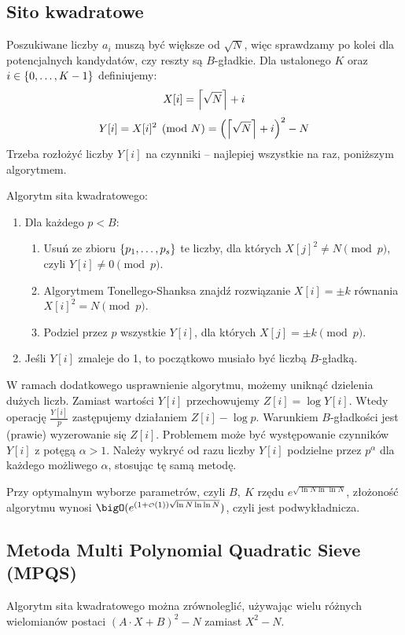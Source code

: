 \subsection{Sito kwadratowe}
Poszukiwane liczby \( a_i \) muszą być większe od \( \sqrt{N} \), więc sprawdzamy po kolei dla potencjalnych kandydatów, czy reszty są \( B \)-gładkie.
Dla ustalonego \( K \) oraz \( i \in \set{0, \dots, K-1} \) definiujemy:
\[ X[i] = \left\lceil\sqrt{N}\right\rceil + i \]
\[ Y[i] = X[i]^2 \pmod{N} = \left(\left\lceil\sqrt{N}\right\rceil + i\right)^2 - N \]
Trzeba rozłożyć liczby \( Y[i] \) na czynniki -- najlepiej wszystkie na raz, poniższym algorytmem.
\begin{greyframe}
    Algorytm sita kwadratowego:
    \begin{enumerate}
        \item Dla każdego \( p < B \):
        \begin{enumerate}
            \item Usuń ze zbioru \( \set{p_1, \dots, p_s} \) te liczby, dla których \( X[j]^2 \neq N \pmod{p} \), \\ czyli \( Y[i] \neq 0 \pmod{p} \).
            \item Algorytmem Tonellego-Shanksa znajdź rozwiązanie \( X[i] = \pm k \) równania \\ \( X[i]^2 = N \pmod{p} \).
            \item Podziel przez \( p \) wszystkie \( Y[i] \), dla których \( X[j] = \pm k \pmod{p} \).
        \end{enumerate}
        \item Jeśli \( Y[i] \) zmaleje do 1, to początkowo musiało być liczbą \( B \)-gładką.
    \end{enumerate}
\end{greyframe}
W ramach dodatkowego usprawnienie algorytmu, możemy uniknąć dzielenia dużych liczb. Zamiast wartości \( Y[i] \) przechowujemy \( Z[i] = \log Y[i] \).
Wtedy operację \( \frac{Y[i]}{p} \) zastępujemy działaniem \( Z[i] - \log p \). Warunkiem \( B \)-gładkości jest (prawie) wyzerowanie się \( Z[i] \).
Problemem może być występowanie czynników \( Y[i] \) z potęgą \( \alpha > 1 \). Należy wykryć od razu liczby \( Y[i] \) podzielne przez \( p^{\alpha} \) dla każdego możliwego \( \alpha \), stosując tę samą metodę.

Przy optymalnym wyborze parametrów, czyli \( B, \ K \) rzędu \( e^{\sqrt{\ln N \ln\ln N}} \), złożoność algorytmu wynosi \( \bigO(e^{(1 + {\scriptscriptstyle\mathcal{O}}(1))\sqrt{\ln N \ln\ln N}}) \), czyli jest podwykładnicza.

\subsection{Metoda Multi Polynomial Quadratic Sieve (MPQS)}
Algorytm sita kwadratowego można zrównoleglić, używając wielu różnych wielomianów postaci \( (A \cdot X + B)^2 - N \) zamiast \( X^2 - N \).
